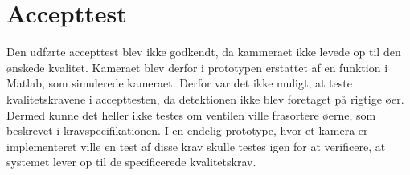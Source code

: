 \section{Accepttest}
Den udførte accepttest blev ikke godkendt, da kammeraet ikke levede op til den ønskede kvalitet. Kameraet blev derfor i prototypen erstattet af en funktion i Matlab, som simulerede kameraet. Derfor var det ikke muligt, at teste kvalitetskravene i accepttesten, da detektionen ikke blev foretaget på rigtige øer. Dermed kunne det heller ikke testes om ventilen ville frasortere øerne, som beskrevet i kravspecifikationen. I en endelig prototype, hvor et kamera er implementeret ville en test af disse krav skulle testes igen for at verificere, at systemet lever op til de specificerede kvalitetskrav. 